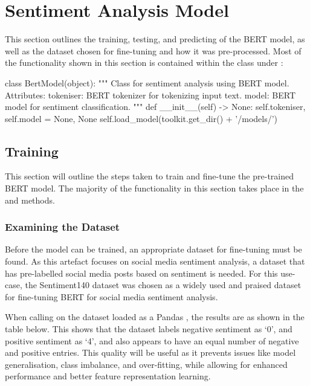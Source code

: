 \section{Sentiment Analysis Model}
This section outlines the training, testing, and predicting of the BERT model, as well as the dataset chosen for fine-tuning and how it was pre-processed. Most of the functionality shown in this section is contained within the  class under :

\begin{python}
class BertModel(object):
    """
    Class for sentiment analysis using BERT model.
    Attributes:
        tokeniser: BERT tokenizer for tokenizing input text.
        model: BERT model for sentiment classification.
    """
    def __init__(self) -> None:
        self.tokeniser, self.model = None, None
        self.load_model(toolkit.get_dir() + '/models/')
\end{python}

    \subsection{Training}
        This section will outline the steps taken to train and fine-tune the pre-trained BERT model. The majority of the functionality in this section takes place in the  and  methods.

        \subsubsection{Examining the Dataset}
        Before the model can be trained, an appropriate dataset for fine-tuning must be found. As this artefact focuses on social media sentiment analysis, a dataset that has pre-labelled social media posts based on sentiment is needed. For this use-case, the Sentiment140 dataset \citep{sentiment140dataset} was chosen as a widely used and praised dataset for fine-tuning BERT for social media sentiment analysis.

        When calling  on the dataset loaded as a Pandas , the results are as shown in the table below. This shows that the dataset labels negative sentiment as `0', and positive sentiment as `4', and also appears to have an equal number of negative and positive entries. This quality will be useful as it prevents issues like model generalisation, class imbalance, and over-fitting, while allowing for enhanced performance and better feature representation learning.


